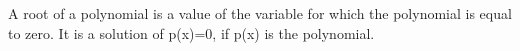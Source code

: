 A root of a polynomial is a value of the variable for which the
polynomial is equal to zero. It is a solution of p(x)=0, if
p(x) is the polynomial.